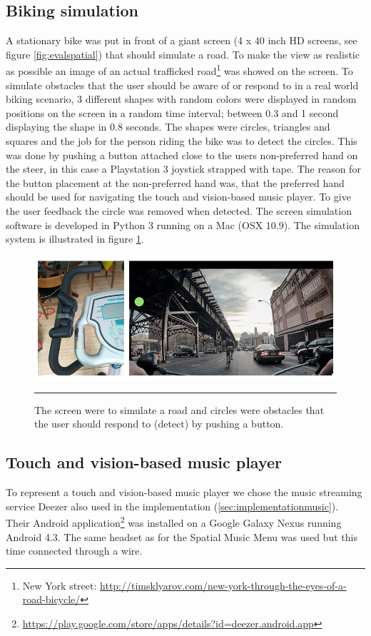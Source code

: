 \subsection{Biking simulation}
A stationary bike was put in front of a giant screen (4 x 40 inch HD screens, see figure \ref{fig:evalspatial}) that should simulate a road. To make the view as realistic as possible an image of an actual trafficked road\footnote{New York street: \url{http://timsklyarov.com/new-york-through-the-eyes-of-a-road-bicycle/}} was showed on the screen. To simulate obstacles that the user should be aware of or respond to in a real world biking scenario, 3 different shapes with random colors were displayed in random positions on the screen in a random time interval; between 0.3 and 1 second displaying the shape in 0.8 seconds. The shapes were circles, triangles and squares and the job for the person riding the bike was to detect the circles. This was done by pushing a button attached close to the users non-preferred hand on the steer, in this case a Playstation 3 joystick strapped with tape. The reason for the button placement at the non-preferred hand was, that the preferred hand should be used for navigating the touch and vision-based music player. To give the user feedback the circle was removed when detected. The screen simulation software is developed in Python 3 running on a Mac (OSX 10.9). The simulation system is illustrated in figure \ref{fig:simulationsystem}.

\begin{figure}[h]
	\centering
		\includegraphics[width=\textwidth,height=\textheight,keepaspectratio]{./Figures/simulation_system.jpg}
		\rule{35em}{1pt}
	\caption[Simulation screen]{The screen were to simulate a road and circles were obstacles that the user should respond to (detect) by pushing a button.}
	\label{fig:simulationsystem}
\end{figure}

\subsection{Touch and vision-based music player}
To represent a touch and vision-based music player we chose the music streaming service Deezer also used in the implementation (\ref{sec:implementationmusic}). Their Android application\footnote{\url{https://play.google.com/store/apps/details?id=deezer.android.app}} was installed on a Google Galaxy Nexus running Android 4.3. The same headset as for the Spatial Music Menu was used but this time connected through a wire.

